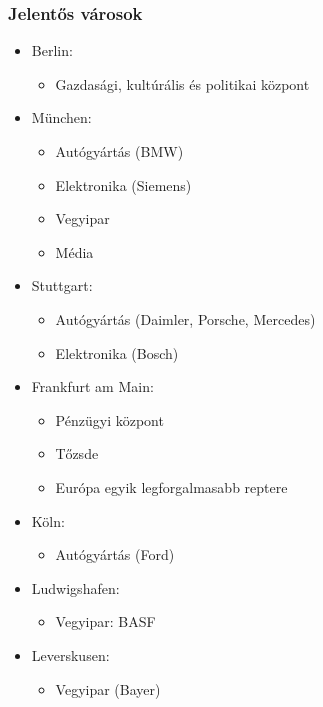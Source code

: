 \documentclass{article}
\begin{document}
\subsubsection{Jelentős városok}
\begin{itemize}
    \item Berlin: \begin{itemize}
        \item Gazdasági, kultúrális és politikai központ
    \end{itemize}
    
    \item München: \begin{itemize}
        \item Autógyártás (BMW)
        \item Elektronika (Siemens)
        \item Vegyipar
        \item Média
    \end{itemize}
    
    \item Stuttgart: \begin{itemize}
        \item Autógyártás (Daimler, Porsche, Mercedes)
        \item Elektronika (Bosch)
    \end{itemize}
    
    \item Frankfurt am Main: \begin{itemize}
        \item Pénzügyi központ
        \item Tőzsde
        \item Európa egyik legforgalmasabb reptere
    \end{itemize}

    \item Köln: \begin{itemize}
        \item Autógyártás (Ford)
    \end{itemize}

    \item Ludwigshafen: \begin{itemize}
        \item Vegyipar: BASF
    \end{itemize}

    \item Leverskusen: \begin{itemize}
        \item Vegyipar (Bayer)
    \end{itemize}


\end{itemize}
\end{document}
